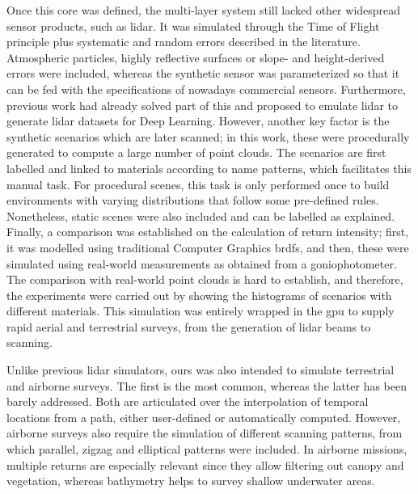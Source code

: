 Once this core was defined, the multi-layer system still lacked other widespread sensor products, such as \acrshort{lidar}. It was simulated through the Time of Flight principle plus systematic and random errors described in the literature. Atmospheric particles, highly reflective surfaces or slope- and height-derived errors were included, whereas the synthetic sensor was parameterized so that it can be fed with the specifications of nowadays commercial sensors. Furthermore, previous work had already solved part of this and proposed to emulate \acrshort{lidar} to generate \acrshort{lidar} datasets for Deep Learning. However, another key factor is the synthetic scenarios which are later scanned; in this work, these were procedurally generated to compute a large number of point clouds. The scenarios are first labelled and linked to materials according to name patterns, which facilitates this manual task. For procedural scenes, this task is only performed once to build environments with varying distributions that follow some pre-defined rules. Nonetheless, static scenes were also included and can be labelled as explained. Finally, a comparison was established on the calculation of return intensity; first, it was modelled using traditional Computer Graphics \acrshort{brdf}s, and then, these were simulated using real-world measurements as obtained from a goniophotometer. The comparison with real-world point clouds is hard to establish, and therefore, the experiments were carried out by showing the histograms of scenarios with different materials. This simulation was entirely wrapped in the \acrshort{gpu} to supply rapid aerial and terrestrial surveys, from the generation of \acrshort{lidar} beams to scanning.

Unlike previous \acrshort{lidar} simulators, ours was also intended to simulate terrestrial and airborne surveys. The first is the most common, whereas the latter has been barely addressed. Both are articulated over the interpolation of temporal locations from a path, either user-defined or automatically computed. However, airborne surveys also require the simulation of different scanning patterns, from which parallel, zigzag and elliptical patterns were included. In airborne missions, multiple returns are especially relevant since they allow filtering out canopy and vegetation, whereas bathymetry helps to survey shallow underwater areas. 

